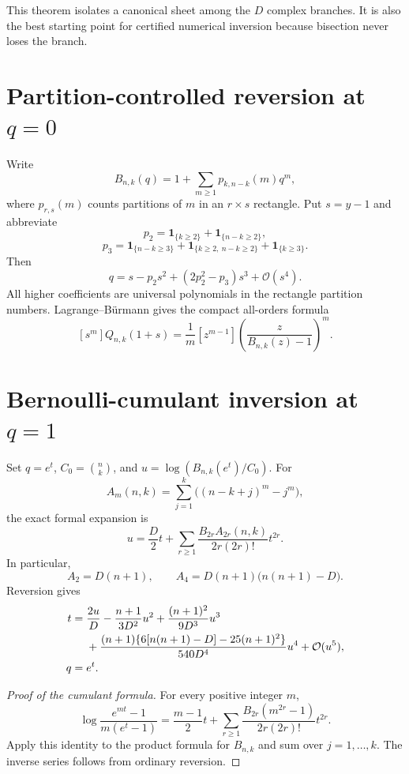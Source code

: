 \documentclass[11pt,oneside]{book}
\theoremstyle{definition}
\theoremstyle{remark}
\newcommand{\OO}{\mathcal{O}}
\begin{document}
This theorem isolates a canonical sheet among the $D$ complex branches.  It is
also the best starting point for certified numerical inversion because
bisection never loses the branch.

\section{Partition-controlled reversion at $q=0$}
Write
\[
 B_{n,k}(q)=1+\sum_{m\ge1}p_{k,n-k}(m)q^m,
\]
where $p_{r,s}(m)$ counts partitions of $m$ in an $r\times s$ rectangle.  Put
$s=y-1$ and abbreviate
\[
 p_2=\mathbf1_{\{k\ge2\}}+\mathbf1_{\{n-k\ge2\}},
\]
\[
 p_3=\mathbf1_{\{n-k\ge3\}}
 +\mathbf1_{\{k\ge2,\ n-k\ge2\}}
 +\mathbf1_{\{k\ge3\}}.
\]
Then
\begin{equation}\label{eq:qbinom-qzero-inverse}
 q=s-p_2s^2+(2p_2^2-p_3)s^3+\OO(s^4).
\end{equation}
All higher coefficients are universal polynomials in the rectangle partition
numbers.  Lagrange--B\"urmann gives the compact all-orders formula
\begin{equation}\label{eq:qbinom-lagrange-qzero}
 [s^m]Q_{n,k}(1+s)
 =\frac1m[z^{m-1}]
 \left(\frac{z}{B_{n,k}(z)-1}\right)^m.
\end{equation}

\section{Bernoulli-cumulant inversion at $q=1$}
Set $q=e^t$, $C_0=\binom nk$, and
$u=\log(B_{n,k}(e^t)/C_0)$.  For
\[
 A_m(n,k)=\sum_{j=1}^k\bigl((n-k+j)^m-j^m\bigr),
\]
the exact formal expansion is
\begin{equation}\label{eq:qbinom-cumulants}
 u=\frac D2t+
 \sum_{r\ge1}\frac{B_{2r}A_{2r}(n,k)}{2r(2r)!}t^{2r}.
\end{equation}
In particular,
\[
 A_2=D(n+1),
 \qquad
 A_4=D(n+1)\bigl(n(n+1)-D\bigr).
\]
Reversion gives
\begin{align}
 t={}&\frac{2u}{D}-\frac{n+1}{3D^2}u^2
 +\frac{(n+1)^2}{9D^3}u^3\notag\\
 &+\frac{(n+1)\{6[n(n+1)-D]-25(n+1)^2\}}
 {540D^4}u^4+\OO(u^5),
 \label{eq:qbinom-qone-inverse}\\
 q={}&e^t.
\end{align}

\begin{proof}[Proof of the cumulant formula]
For every positive integer $m$,
\[
 \log\frac{e^{mt}-1}{m(e^t-1)}
 =\frac{m-1}{2}t+
 \sum_{r\ge1}\frac{B_{2r}(m^{2r}-1)}{2r(2r)!}t^{2r}.
\]
Apply this identity to the product formula for $B_{n,k}$ and sum over
$j=1,\ldots,k$.  The inverse series follows from ordinary reversion.
\end{proof}
\end{document}
